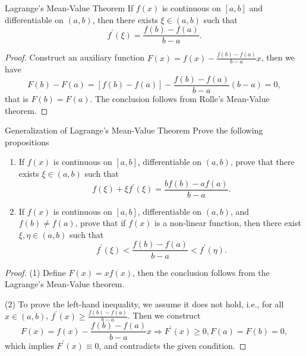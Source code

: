 \begin{theorem}{Lagrange's Mean-Value Theorem}{}
  If $f(x)$ is continuous on $[a, b]$ and differentiable on $(a, b)$,
  then there exists $\xi \in (a, b)$ such that
  \begin{equation}
    f^{\prime}(\xi) = \frac{f(b) - f(a)}{b - a}.
  \end{equation}
\end{theorem}

\begin{proof}
  Construct an auxiliary function
  $F(x) = f(x) - \frac{f(b) - f(a)}{b - a}x$,
  then we have
  \begin{equation}
    F(b) - F(a) = \left[ f(b) - f(a) \right]
    - \frac{f(b) - f(a)}{b - a}(b - a) = 0,
  \end{equation}
  that is $F(b) = F(a)$.
  The conclusion follows from Rolle's Mean-Value theorem.
\end{proof}

\begin{example}{Generalization of Lagrange's Mean-Value Theorem}{}
  Prove the following propositions
  \begin{enumerate}
  \item If $f(x)$ is continuous on $[a, b]$, differentiable on $(a, b)$, prove
    that there exists $\xi \in (a, b)$ such that
    \begin{equation}
      f(\xi) + \xi f^{\prime}(\xi) = \frac{b f(b) - a f(a)}{b - a}.
    \end{equation}
  \item If $f(x)$ is continuous on $[a, b]$, differentiable on $(a, b)$, and
    $f(b) \neq f(a)$, prove that if $f(x)$ is a non-linear function, then there exist
    $\xi, \eta \in (a, b)$ such that
    \begin{equation}
      f^{\prime}(\xi) < \frac{f(b) - f(a)}{b - a} < f^{\prime}(\eta).
    \end{equation}
  \end{enumerate}
\end{example}

\begin{proof}
  (1) Define $F(x) = xf(x)$, then the conclusion follows from the Lagrange's
  Mean-Value theorem.

  (2) To prove the left-hand inequality, we assume it does not hold,
  i.e., for all $x \in (a, b)$, $f^{\prime}(x) \geq \frac{f(b) - f(a)}{b - a}$.
  Then we construct
  \begin{equation}
    F(x) = f(x) - \frac{f(b) - f(a)}{b - a} x  \Rightarrow
    F^{\prime}(x) \geq 0, F(a) = F(b) = 0,
  \end{equation}
  which implies $F^{\prime}(x) \equiv 0$,
  and contradicts the given condition.
\end{proof}

